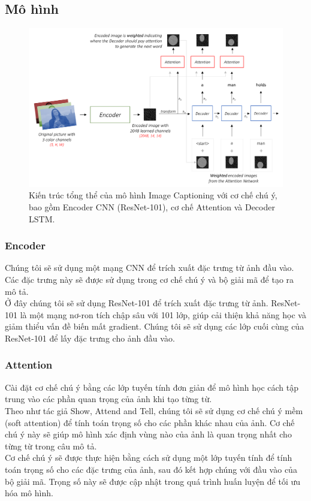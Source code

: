\documentclass[conference]{IEEEtran}
\begin{document}
\subsection{Mô hình}
\begin{figure}[htbp]
    \centering
    \includegraphics[width=\linewidth]{attachments/model.png}
    \caption{Kiến trúc tổng thể của mô hình Image Captioning với cơ chế chú ý, bao gồm Encoder CNN (ResNet-101), cơ chế Attention và Decoder LSTM.}
    \label{fig:model}
\end{figure}
\subsubsection{Encoder}
Chúng tôi sẽ sử dụng một mạng CNN để trích xuất đặc trưng từ ảnh đầu vào. Các đặc trưng này sẽ được sử dụng trong cơ chế chú ý và bộ giải mã để tạo ra mô tả.\\
Ở đây chúng tôi sẽ sử dụng ResNet-101 để trích xuất đặc trưng từ ảnh. ResNet-101 là một mạng nơ-ron tích chập sâu với 101 lớp, giúp cải thiện khả năng học và giảm thiểu vấn đề biến mất gradient. Chúng tôi sẽ sử dụng các lớp cuối cùng của ResNet-101 để lấy đặc trưng cho ảnh đầu vào.

\subsubsection{Attention}
Cài đặt cơ chế chú ý bằng các lớp tuyến tính đơn giản để mô hình học cách tập trung vào các phần quan trọng của ảnh khi tạo từng từ.\\
Theo như tác giả Show, Attend and Tell, chúng tôi sẽ sử dụng cơ chế chú ý mềm (soft attention) để tính toán trọng số cho các phần khác nhau của ảnh. Cơ chế chú ý này sẽ giúp mô hình xác định vùng nào của ảnh là quan trọng nhất cho từng từ trong câu mô tả.\\
Cơ chế chú ý sẽ được thực hiện bằng cách sử dụng một lớp tuyến tính để tính toán trọng số cho các đặc trưng của ảnh, sau đó kết hợp chúng với đầu vào của bộ giải mã. Trọng số này sẽ được cập nhật trong quá trình huấn luyện để tối ưu hóa mô hình.
\end{document}
